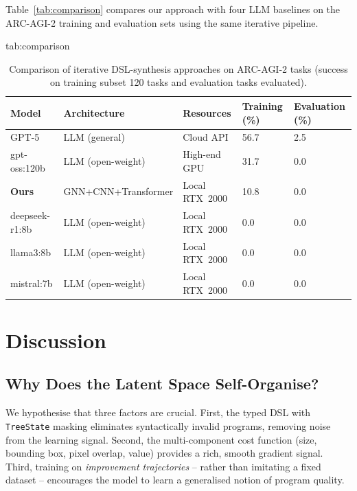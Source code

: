 \documentclass[final]{nesy2027}
\begin{document}
Table~\ref{tab:comparison} compares our approach with four LLM baselines on the
ARC-AGI-2 training and evaluation sets using the same iterative pipeline.

\begin{table}[htbp]
\floatconts
  {tab:comparison}
  {\caption{Comparison of iterative DSL-synthesis approaches on
    ARC-AGI-2 tasks (success on training subset 120 tasks and evaluation tasks evaluated).}}
  {%
  \begin{tabular}{lllll}
  \toprule
  \bfseries Model & \bfseries Architecture & \bfseries Resources
    & \bfseries Training (\%) & \bfseries Evaluation (\%) \\
  \midrule
  GPT-5           & LLM (general)        & Cloud API       & 56.7 & 2.5 \\
  gpt-oss:120b    & LLM (open-weight)    & High-end GPU    & 31.7 & 0.0 \\
  \textbf{Ours}   & GNN+CNN+Transformer  & Local RTX~2000  & 10.8 & 0.0 \\
  deepseek-r1:8b  & LLM (open-weight)    & Local RTX~2000  & 0.0  & 0.0 \\
  llama3:8b       & LLM (open-weight)    & Local RTX~2000  & 0.0  & 0.0 \\
  mistral:7b      & LLM (open-weight)    & Local RTX~2000  & 0.0  & 0.0 \\
  \bottomrule
  \end{tabular}}
\end{table}

\section{Discussion}
\label{sec:discussion}

\subsection{Why Does the Latent Space Self-Organise?}

We hypothesise that three factors are crucial.
First, the typed DSL with \texttt{TreeState} masking eliminates syntactically
invalid programs, removing noise from the learning signal.
Second, the multi-component cost function (size, bounding box, pixel overlap,
value) provides a rich, smooth gradient signal.
Third, training on \emph{improvement trajectories} -- rather than imitating a
fixed dataset -- encourages the model to learn a generalised notion of program
quality.
\end{document}
